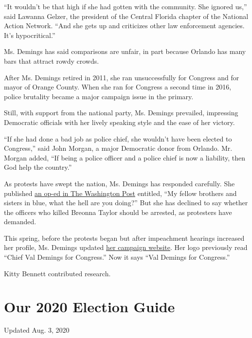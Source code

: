 ``It wouldn't be that high if she had gotten with the community. She
ignored us,'' said Lawanna Gelzer, the president of the Central Florida
chapter of the National Action Network. ``And she gets up and criticizes
other law enforcement agencies. It's hypocritical.''

Ms. Demings has said comparisons are unfair, in part because Orlando has
many bars that attract rowdy crowds.

After Ms. Demings retired in 2011, she ran unsuccessfully for Congress
and for mayor of Orange County. When she ran for Congress a second time
in 2016, police brutality became a major campaign issue in the primary.

Still, with support from the national party, Ms. Demings prevailed,
impressing Democratic officials with her lively speaking style and the
ease of her victory.

``If she had done a bad job as police chief, she wouldn't have been
elected to Congress,'' said John Morgan, a major Democratic donor from
Orlando. Mr. Morgan added, ``If being a police officer and a police
chief is now a liability, then God help the country.''

As protests have swept the nation, Ms. Demings has responded carefully.
She published
\href{https://www.washingtonpost.com/opinions/2020/05/29/my-fellow-brothers-sisters-blue-what-earth-are-you-doing/}{an
op-ed in The Washington Post} entitled, ``My fellow brothers and sisters
in blue, what the hell are you doing?'' But she has declined to say
whether the officers who killed Breonna Taylor should be arrested, as
protesters have demanded.

This spring, before the protests began but after impeachment hearings
increased her profile, Ms. Demings updated
\href{https://valdemings.com/}{her campaign website}. Her logo
previously read ``Chief Val Demings for Congress.'' Now it says ``Val
Demings for Congress.''

Kitty Bennett contributed research.

\hypertarget{our-2020-election-guide}{%
\section{Our 2020 Election Guide}\label{our-2020-election-guide}}

Updated Aug. 3, 2020

